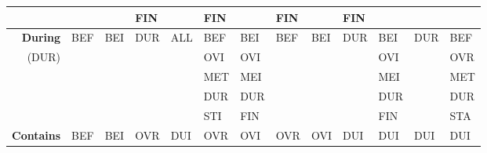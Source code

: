 \documentclass[11pt]{report}
\newenvironment{vvarmargin}[2]
{
  \begin{list}{}
  {
    \setlength{\topsep}{0pt}
    \setlength{\leftmargin}{0pt}
    \setlength{\rightmargin}{0pt}
    \setlength{\listparindent}{\parindent}
    \setlength{\itemindent}{\parindent}
    \setlength{\parsep}{0pt plus 1pt}
    \addtolength{\leftmargin}{#1}\addtolength{\rightmargin}{#2}
  }
  \item
}
{
  \end{list}
}
\begin{document}
\begin{table}[p]
\begin{vvarmargin}{-4cm}{-4cm}
\begin{center}
\begin{tabular}[t]{|r|l|l|l|l|l|l|l|l|l|l|l|l|}
                                        &                         &                         & FIN                     &                         & FIN                     &                         & FIN                     &                         & FIN                     &                         &                         &                         \\
                \hline
                \textbf{During}         & BEF                     & BEI                     & DUR                     & ALL                     & BEF                     & BEI                     & BEF                     & BEI                     & DUR                     & BEI                     & DUR                     & BEF                     \\
                (DUR)                   &                         &                         &                         &                         & OVI                     & OVI                     &                         &                         &                         & OVI                     &                         & OVR                     \\
                                        &                         &                         &                         &                         & MET                     & MEI                     &                         &                         &                         & MEI                     &                         & MET                     \\
                                        &                         &                         &                         &                         & DUR                     & DUR                     &                         &                         &                         & DUR                     &                         & DUR                     \\
                                        &                         &                         &                         &                         & STI                     & FIN                     &                         &                         &                         & FIN                     &                         & STA                     \\
                \hline
                \textbf{Contains}       & BEF                     & BEI                     & OVR                     & DUI                     & OVR                     & OVI                     & OVR                     & OVI                     & DUI                     & DUI                     & DUI                     & DUI                     \\

\end{tabular}
\end{center}
\end{vvarmargin}
\end{table}
\end{document}
